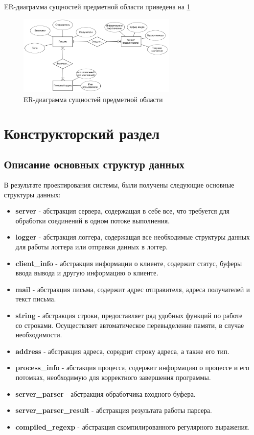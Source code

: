 \documentclass[a4paper,12pt]{report}
\begin{document}
ER-диаграмма сущностей предметной области приведена на \ref{fig:er}

\begin{figure}[H]
	\centering
	\includegraphics[width=0.7\textwidth]{include/er.pdf}
	\caption{ER-диаграмма сущностей предметной области}
	\label{fig:er}
\end{figure}

\newpage
\chapter{Конструкторский раздел}

\section{Описание основных структур данных}

В результате проектирования системы, были получены следующие основные структуры данных: 
\begin{itemize}
	\item \textbf{server} - абстракция сервера, содержащая в себе все, что требуется для обработки соединений в одном потоке выполнения. 
	\item \textbf{logger} - абстракция логгера, содержащая все необходимые структуры данных для работы логгера или отправки данных в логгер. 
	\item \textbf{client\_info} - абстракция информации о клиенте, содержит статус, буферы ввода вывода и другую информацию о клиенте.
	\item \textbf{mail} - абстракция письма, содержит адрес отправителя, адреса получателей и текст письма. 
	\item \textbf{string} - абстракция строки, предоставляет ряд удобных функций по работе со строками. Осуществляет автоматическое перевыделение памяти, в случае необходимости. 
	\item \textbf{address} - абстракция адреса, соредрит строку адреса, а также его тип. 
	\item \textbf{process\_info} - абстакция процесса, содержит информацию о процессе и его потомках, необходимую для корректного завершения программы. 
	\item \textbf{server\_parser} - абстракция обработчика входного буфера. 
	\item \textbf{server\_parser\_result} - абстракция результата работы парсера. 
	\item \textbf{compiled\_regexp} - абстракция скомпилированного регулярного выражения. 
\end{itemize}
\end{document}
